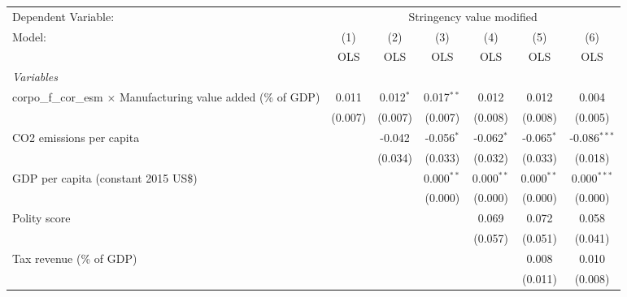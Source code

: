 
\begingroup
\centering
\begin{tabular}{lcccccc}
   \toprule
   Dependent Variable: & \multicolumn{6}{c}{Stringency value modified}\\
   Model:                                                                 & (1)     & (2)         & (3)          & (4)          & (5)          & (6)\\  
                                                                          &  OLS    & OLS         & OLS          & OLS          & OLS          & OLS\\  
   \midrule
   \emph{Variables}\\
   corpo\_f\_cor\_esm $\times$ Manufacturing value added (\% of GDP)      & 0.011   & 0.012$^{*}$ & 0.017$^{**}$ & 0.012        & 0.012        & 0.004\\   
                                                                          & (0.007) & (0.007)     & (0.007)      & (0.008)      & (0.008)      & (0.005)\\   
   CO2 emissions per capita                                               &         & -0.042      & -0.056$^{*}$ & -0.062$^{*}$ & -0.065$^{*}$ & -0.086$^{***}$\\   
                                                                          &         & (0.034)     & (0.033)      & (0.032)      & (0.033)      & (0.018)\\   
   GDP per capita (constant 2015 US\$)                                    &         &             & 0.000$^{**}$ & 0.000$^{**}$ & 0.000$^{**}$ & 0.000$^{***}$\\   
                                                                          &         &             & (0.000)      & (0.000)      & (0.000)      & (0.000)\\   
   Polity score                                                           &         &             &              & 0.069        & 0.072        & 0.058\\   
                                                                          &         &             &              & (0.057)      & (0.051)      & (0.041)\\   
   Tax revenue (\% of GDP)                                                &         &             &              &              & 0.008        & 0.010\\   
                                                                          &         &             &              &              & (0.011)      & (0.008)\\   

\end{tabular}
